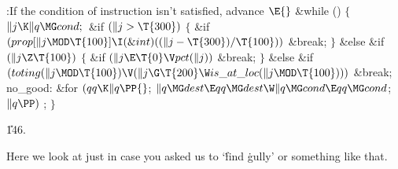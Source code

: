 \B{}:If the condition of instruction  isn't satisfied, advance \X${}\E{}$\6
\&{while} ()\5
${}\{{}$\1\6
${}\|j\K\|q\MG\\{cond};{}$\6
\&{if} ${}(\|j>\T{300}){}$\5
${}\{{}$\1\6
\&{if} ${}(\\{prop}[\|j\MOD\T{100}]\I(\&{int})((\|j-\T{300})/\T{100})){}$\1\5
\&{break};\2\6
\4${}\}{}$\5
\2\&{else} \&{if} ${}(\|j\Z\T{100}){}$\5
${}\{{}$\1\6
\&{if} ${}(\|j\E\T{0}\V\\{pct}(\|j)){}$\1\5
\&{break};\2\6
\4${}\}{}$\5
\2\&{else} \&{if} ${}(\\{toting}(\|j\MOD\T{100})\V(\|j\G\T{200}\W\\{is\_at\_loc}(\|j\MOD\T{100}))){}$\1\5
\&{break};\2\6
\4\\{no\_good}:\6
\&{for} ${}(\\{qq}\K\|q\PP{}$;\6
${}\|q\MG\\{dest}\E\\{qq}\MG\\{dest}\W\|q\MG\\{cond}\E\\{qq}\MG\\{cond}{}$;\6
${}\|q\PP){}$\1\5
;\2\6
\4${}\}{}$\2\par
\U146.\fi

Here we look at  just in case you asked us to `\.{find} \.{gully}'
or something like that.

